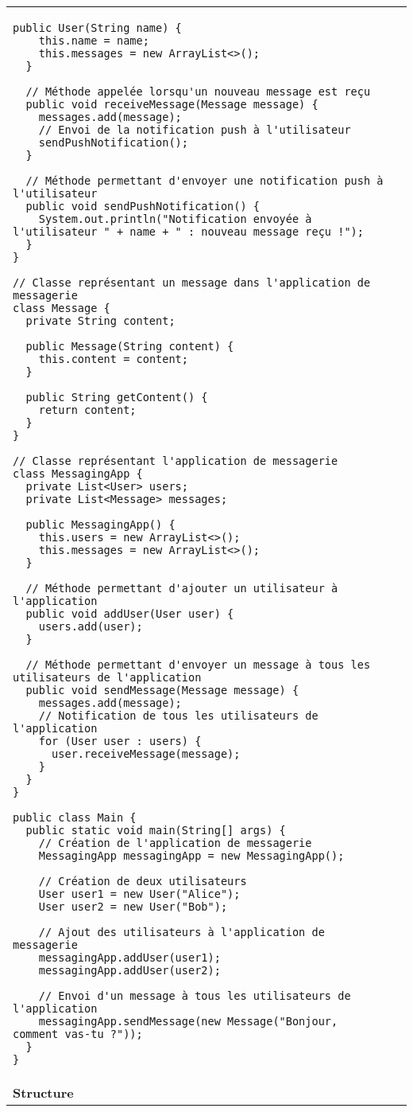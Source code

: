 \begin{table}[H]
\begin{adjustbox}{max width=\textwidth}
\begin{tabular}{l|p{\textwidth}}
\begin{minipage}[tr]{0.5\textwidth}
\begin{minipage}[b]{1\textwidth}
\begin{lstlisting}[style=monstyle]
  public User(String name) {
    this.name = name;
    this.messages = new ArrayList<>();
  }

  // Méthode appelée lorsqu'un nouveau message est reçu
  public void receiveMessage(Message message) {
    messages.add(message);
    // Envoi de la notification push à l'utilisateur
    sendPushNotification();
  }

  // Méthode permettant d'envoyer une notification push à l'utilisateur
  public void sendPushNotification() {
    System.out.println("Notification envoyée à l'utilisateur " + name + " : nouveau message reçu !");
  }
}

// Classe représentant un message dans l'application de messagerie
class Message {
  private String content;

  public Message(String content) {
    this.content = content;
  }

  public String getContent() {
    return content;
  }
}

// Classe représentant l'application de messagerie
class MessagingApp {
  private List<User> users;
  private List<Message> messages;

  public MessagingApp() {
    this.users = new ArrayList<>();
    this.messages = new ArrayList<>();
  }

  // Méthode permettant d'ajouter un utilisateur à l'application
  public void addUser(User user) {
    users.add(user);
  }

  // Méthode permettant d'envoyer un message à tous les utilisateurs de l'application
  public void sendMessage(Message message) {
    messages.add(message);
    // Notification de tous les utilisateurs de l'application
    for (User user : users) {
      user.receiveMessage(message);
    }
  }
}

public class Main {
  public static void main(String[] args) {
    // Création de l'application de messagerie
    MessagingApp messagingApp = new MessagingApp();

    // Création de deux utilisateurs
    User user1 = new User("Alice");
    User user2 = new User("Bob");

    // Ajout des utilisateurs à l'application de messagerie
    messagingApp.addUser(user1);
    messagingApp.addUser(user2);

    // Envoi d'un message à tous les utilisateurs de l'application
    messagingApp.sendMessage(new Message("Bonjour, comment vas-tu ?"));
  }
}

\end{lstlisting}
\end{minipage}
\end{minipage}
\\
\cmidrule(lr){1-2}
\textbf{Structure} & \\
\bottomrule
\end{tabular}
\end{adjustbox}
\end{table}

